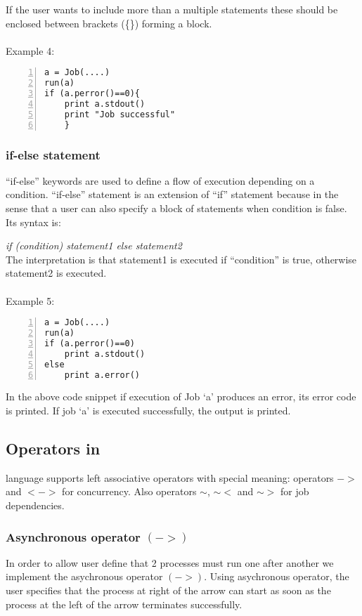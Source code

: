 If the user wants to include more than a multiple statements these should be enclosed between brackets (\{\}) forming a block.\\
\\
Example 4:
\begin{Verbatim}[numbers=left]
a = Job(....)
run(a)
if (a.perror()==0){
    print a.stdout()
    print "Job successful"
    }
\end{Verbatim}
\subsubsection*{if-else statement}
``if-else'' keywords are used to define a flow of execution depending on a condition. ``if-else'' statement is an extension of ``if'' statement because
in the sense that a user can also specify a block of statements when condition is false. Its syntax is:

\textit{if (condition) statement1 else statement2}\\
The interpretation is that statement1 is executed if ``condition'' is true, otherwise statement2 is executed.\\
\\
Example 5:
\begin{Verbatim}[numbers=left]
a = Job(....)
run(a)
if (a.perror()==0)
    print a.stdout()
else
    print a.error()
\end{Verbatim}

In the above code snippet if execution of Job `a' produces an error, its error code is printed. If job `a' is executed successfully, the output is printed.


\subsection*{Operators in \lang{}}

\lang{} language supports left associative operators with special meaning: operators $->$ and $<->$ for concurrency. 
Also operators $\sim$, $\sim<$ and $\sim>$ for job dependencies.
\subsubsection*{Asynchronous operator $(->)$}
In order to allow user define that 2 processes must run one after another
we implement the asychronous operator $(->)$. Using asychronous operator, the user
specifies that the process at right of the arrow can start as soon as
the process at the left of the arrow terminates successfully.
